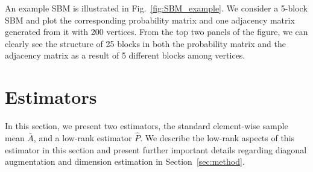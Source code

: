 \documentclass[10pt,letterpaper]{article}
\renewcommand{\hat}{\widehat}
\begin{document}
An example SBM is illustrated in Fig.~\ref{fig:SBM_example}.
We consider a 5-block SBM and plot the corresponding probability matrix and one adjacency matrix generated from it with 200 vertices. From the top two panels of the figure, we can clearly see the structure of 25 blocks in both the probability matrix and the adjacency matrix as a result of 5 different blocks among vertices.



\section{Estimators}
\label{sec:estimator}

In this section, we present two estimators, the standard element-wise sample mean $\bar{A}$, and a low-rank estimator $\hat{P}$.
We describe the low-rank aspects of this estimator in this section and present further important details regarding diagonal augmentation and dimension estimation in Section~\ref{sec:method}.
\end{document}
